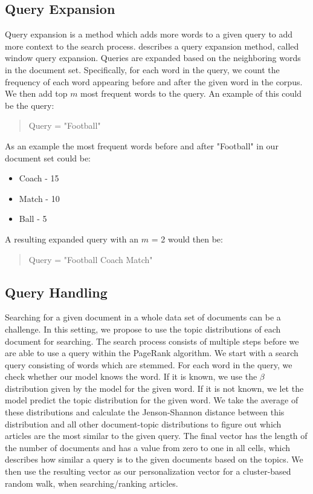 \subsection{Query Expansion}
Query expansion is a method which adds more words to a given query to add more context to the search process.
\citet{yang2009topic} describes a query expansion method, called window query expansion.
Queries are expanded based on the neighboring words in the document set.
Specifically, for each word in the query, we count the frequency of each word appearing before and after the given word in the corpus.
We then add top $m$ most frequent words to the query.
An example of this could be the query: 
\begin{quote}
	Query = "Football"
\end{quote}
As an example the most frequent words before and after "Football" in our document set could be:
\begin{itemize}
	\item Coach - 15
	\item Match - 10
	\item Ball - 5
\end{itemize}
A resulting expanded query with an $m$ = 2 would then be:
\begin{quote}
	Query = "Football Coach Match"
\end{quote}



\subsection{Query Handling}
Searching for a given document in a whole data set of documents can be a challenge. 
In this setting, we propose to use the topic distributions of each document for searching.
The search process consists of multiple steps before we are able to use a query within the PageRank algorithm. 
We start with a search query consisting of words which are stemmed.
For each word in the query, we check whether our model knows the word.
If it is known, we use the $\beta$ distribution given by the model for the given word. 
If it is not known, we let the model predict the topic distribution for the given word.
We take the average of these distributions and calculate the Jenson-Shannon distance between this distribution and all other document-topic distributions to figure out which articles are the most similar to the given query.
The final vector has the length of the number of documents and has a value from zero to one in all cells, which describes how similar a query is to the given documents based on the topics.
We then use the resulting vector as our personalization vector for a cluster-based random walk, when searching/ranking articles.
 
